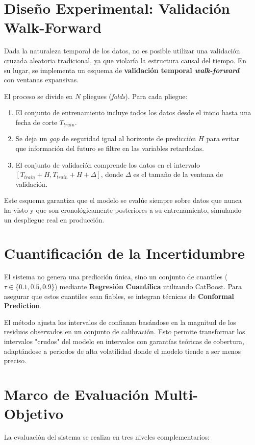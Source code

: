 \section{Diseño Experimental: Validación Walk-Forward}
Dada la naturaleza temporal de los datos, no es posible utilizar una validación cruzada aleatoria tradicional, ya que violaría la estructura causal del tiempo. En su lugar, se implementa un esquema de \textbf{validación temporal \textit{walk-forward}} con ventanas expansivas.

El proceso se divide en $N$ pliegues (\textit{folds}). Para cada pliegue:
\begin{enumerate}
    \item El conjunto de entrenamiento incluye todos los datos desde el inicio hasta una fecha de corte $T_{train}$.
    \item Se deja un \textit{gap} de seguridad igual al horizonte de predicción $H$ para evitar que información del futuro se filtre en las variables retardadas.
    \item El conjunto de validación comprende los datos en el intervalo $[T_{train} + H, T_{train} + H + \Delta]$, donde $\Delta$ es el tamaño de la ventana de validación.
\end{enumerate}

Este esquema garantiza que el modelo se evalúe siempre sobre datos que nunca ha visto y que son cronológicamente posteriores a su entrenamiento, simulando un despliegue real en producción.

\section{Cuantificación de la Incertidumbre}
El sistema no genera una predicción única, sino un conjunto de cuantiles ($\tau \in \{0.1, 0.5, 0.9\}$) mediante \textbf{Regresión Cuantílica} utilizando CatBoost. Para asegurar que estos cuantiles sean fiables, se integran técnicas de \textbf{Conformal Prediction}. 

El método ajusta los intervalos de confianza basándose en la magnitud de los residuos observados en un conjunto de calibración. Esto permite transformar los intervalos "crudos" del modelo en intervalos con garantías teóricas de cobertura, adaptándose a periodos de alta volatilidad donde el modelo tiende a ser menos preciso.

\section{Marco de Evaluación Multi-Objetivo}
La evaluación del sistema se realiza en tres niveles complementarios:

